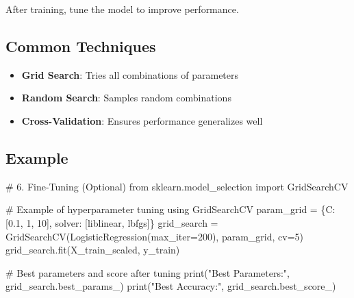 \documentclass[
  letterpaper,
  DIV=11,
  numbers=noendperiod]{scrreprt}
\newenvironment{Shaded}{\begin{snugshade}}{\end{snugshade}}
\newcommand{\BuiltInTok}[1]{\textcolor[rgb]{0.00,0.23,0.31}{#1}}
\newcommand{\CommentTok}[1]{\textcolor[rgb]{0.37,0.37,0.37}{#1}}
\newcommand{\DecValTok}[1]{\textcolor[rgb]{0.68,0.00,0.00}{#1}}
\newcommand{\FloatTok}[1]{\textcolor[rgb]{0.68,0.00,0.00}{#1}}
\newcommand{\ImportTok}[1]{\textcolor[rgb]{0.00,0.46,0.62}{#1}}
\newcommand{\NormalTok}[1]{\textcolor[rgb]{0.00,0.23,0.31}{#1}}
\newcommand{\OperatorTok}[1]{\textcolor[rgb]{0.37,0.37,0.37}{#1}}
\newcommand{\StringTok}[1]{\textcolor[rgb]{0.13,0.47,0.30}{#1}}
\providecommand{\tightlist}{%
  \setlength{\itemsep}{0pt}\setlength{\parskip}{0pt}}\usepackage{longtable,booktabs,array}
\begin{document}
After training, tune the model to improve performance.

\subsection{Common Techniques}\label{common-techniques}

\begin{itemize}
\tightlist
\item
  \textbf{Grid Search}: Tries all combinations of parameters\\
\item
  \textbf{Random Search}: Samples random combinations\\
\item
  \textbf{Cross-Validation}: Ensures performance generalizes well
\end{itemize}

\subsection{Example}\label{example}

\begin{Shaded}
\begin{Highlighting}[]
\CommentTok{\# 6. Fine{-}Tuning (Optional)}
\ImportTok{from}\NormalTok{ sklearn.model\_selection }\ImportTok{import}\NormalTok{ GridSearchCV}

\CommentTok{\# Example of hyperparameter tuning using GridSearchCV}
\NormalTok{param\_grid }\OperatorTok{=}\NormalTok{ \{}\StringTok{\textquotesingle{}C\textquotesingle{}}\NormalTok{: [}\FloatTok{0.1}\NormalTok{, }\DecValTok{1}\NormalTok{, }\DecValTok{10}\NormalTok{], }\StringTok{\textquotesingle{}solver\textquotesingle{}}\NormalTok{: [}\StringTok{\textquotesingle{}liblinear\textquotesingle{}}\NormalTok{, }\StringTok{\textquotesingle{}lbfgs\textquotesingle{}}\NormalTok{]\}}
\NormalTok{grid\_search }\OperatorTok{=}\NormalTok{ GridSearchCV(LogisticRegression(max\_iter}\OperatorTok{=}\DecValTok{200}\NormalTok{), param\_grid, cv}\OperatorTok{=}\DecValTok{5}\NormalTok{)}
\NormalTok{grid\_search.fit(X\_train\_scaled, y\_train)}

\CommentTok{\# Best parameters and score after tuning}
\BuiltInTok{print}\NormalTok{(}\StringTok{"Best Parameters:"}\NormalTok{, grid\_search.best\_params\_)}
\BuiltInTok{print}\NormalTok{(}\StringTok{"Best Accuracy:"}\NormalTok{, grid\_search.best\_score\_)}
\end{Highlighting}
\end{Shaded}
\end{document}
